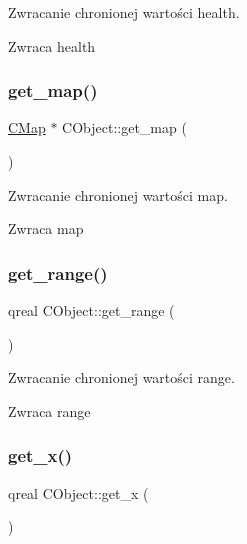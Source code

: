 Zwracanie chronionej wartości health. 

\begin{DoxyReturn}{Zwraca}
health 
\end{DoxyReturn}
\mbox{\label{class_c_object_ae357ff56797d1561a7c16c250b686747}} 
\subsubsection{\texorpdfstring{get\+\_\+map()}{get\_map()}}
{\footnotesize\ttfamily \mbox{\hyperlink{class_c_map}{C\+Map}} $\ast$ C\+Object\+::get\+\_\+map (\begin{DoxyParamCaption}{ }\end{DoxyParamCaption})}



Zwracanie chronionej wartości map. 

\begin{DoxyReturn}{Zwraca}
map 
\end{DoxyReturn}
\mbox{\label{class_c_object_ae4d6cb4753f3ca0782158890160b7e18}} 
\subsubsection{\texorpdfstring{get\+\_\+range()}{get\_range()}}
{\footnotesize\ttfamily qreal C\+Object\+::get\+\_\+range (\begin{DoxyParamCaption}{ }\end{DoxyParamCaption})}



Zwracanie chronionej wartości range. 

\begin{DoxyReturn}{Zwraca}
range 
\end{DoxyReturn}
\mbox{\label{class_c_object_aeb2157f241db131ecc1279eeb25f5790}} 
\subsubsection{\texorpdfstring{get\+\_\+x()}{get\_x()}}
{\footnotesize\ttfamily qreal C\+Object\+::get\+\_\+x (\begin{DoxyParamCaption}{ }\end{DoxyParamCaption})}



